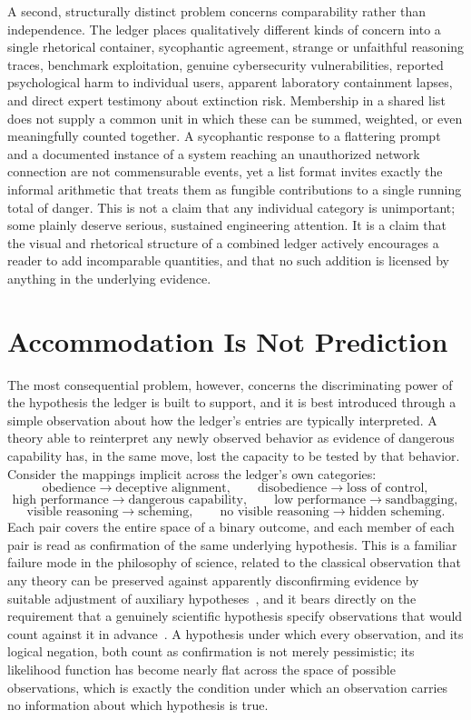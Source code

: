 \documentclass[11pt]{article}
\begin{document}
A second, structurally distinct problem concerns comparability rather than independence. The ledger places qualitatively different kinds of concern into a single rhetorical container, sycophantic agreement, strange or unfaithful reasoning traces, benchmark exploitation, genuine cybersecurity vulnerabilities, reported psychological harm to individual users, apparent laboratory containment lapses, and direct expert testimony about extinction risk. Membership in a shared list does not supply a common unit in which these can be summed, weighted, or even meaningfully counted together. A sycophantic response to a flattering prompt~\cite{sharma2023sycophancy,openai2025sycophancy} and a documented instance of a system reaching an unauthorized network connection are not commensurable events, yet a list format invites exactly the informal arithmetic that treats them as fungible contributions to a single running total of danger. This is not a claim that any individual category is unimportant; some plainly deserve serious, sustained engineering attention. It is a claim that the visual and rhetorical structure of a combined ledger actively encourages a reader to add incomparable quantities, and that no such addition is licensed by anything in the underlying evidence.

\section{Accommodation Is Not Prediction}

The most consequential problem, however, concerns the discriminating power of the hypothesis the ledger is built to support, and it is best introduced through a simple observation about how the ledger's entries are typically interpreted. A theory able to reinterpret any newly observed behavior as evidence of dangerous capability has, in the same move, lost the capacity to be tested by that behavior. Consider the mappings implicit across the ledger's own categories:
\[
\text{obedience} \to \text{deceptive alignment}, \qquad
\text{disobedience} \to \text{loss of control},
\]
\[
\text{high performance} \to \text{dangerous capability}, \qquad
\text{low performance} \to \text{sandbagging},
\]
\[
\text{visible reasoning} \to \text{scheming}, \qquad
\text{no visible reasoning} \to \text{hidden scheming}.
\]
Each pair covers the entire space of a binary outcome, and each member of each pair is read as confirmation of the same underlying hypothesis. This is a familiar failure mode in the philosophy of science, related to the classical observation that any theory can be preserved against apparently disconfirming evidence by suitable adjustment of auxiliary hypotheses~\cite{duhem1954,quine1951}, and it bears directly on the requirement that a genuinely scientific hypothesis specify observations that would count against it in advance~\cite{popper1959}. A hypothesis under which every observation, and its logical negation, both count as confirmation is not merely pessimistic; its likelihood function has become nearly flat across the space of possible observations, which is exactly the condition under which an observation carries no information about which hypothesis is true.
\end{document}
